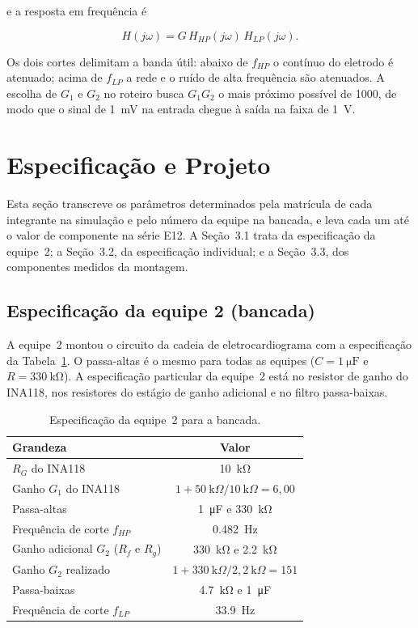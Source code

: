\documentclass[11pt,a4paper]{article}
\begin{document}
e a resposta em frequência é

\begin{equation}
H(j\omega) = G \, H_{HP}(j\omega) \, H_{LP}(j\omega) .
\label{eq:cadeia}
\end{equation}

Os dois cortes delimitam a banda útil: abaixo de $f_{HP}$ o contínuo do eletrodo é atenuado; acima de $f_{LP}$ a rede e o ruído de alta frequência são atenuados. A escolha de $G_1$ e $G_2$ no roteiro busca $G_1 G_2$ o mais próximo possível de 1000, de modo que o sinal de \SI{1}{\milli\volt} na entrada chegue à saída na faixa de \SI{1}{\volt}.

\section{Especificação e Projeto}

Esta seção transcreve os parâmetros determinados pela matrícula de cada integrante na simulação e pelo número da equipe na bancada, e leva cada um até o valor de componente na série E12. A Seção~3.1 trata da especificação da equipe~2; a Seção~3.2, da especificação individual; e a Seção~3.3, dos componentes medidos da montagem.

\subsection{Especificação da equipe 2 (bancada)}

A equipe~2 montou o circuito da cadeia de eletrocardiograma com a especificação da Tabela~\ref{tab:equipe_r4}. O passa-altas é o mesmo para todas as equipes ($C = \SI{1}{\micro\farad}$ e $R = \SI{330}{\kilo\ohm}$). A especificação particular da equipe~2 está no resistor de ganho do INA118, nos resistores do estágio de ganho adicional e no filtro passa-baixas.

\begin{table}[h]
\centering
\caption{Especificação da equipe~2 para a bancada.}
\label{tab:equipe_r4}
\begin{tabular}{lc}
\hline
Grandeza & Valor \\
\hline
$R_G$ do INA118 & \SI{10}{\kilo\ohm} \\
Ganho $G_1$ do INA118 & $1 + 50~\text{k}\Omega / 10~\text{k}\Omega = 6{,}00$ \\
Passa-altas & \SI{1}{\micro\farad} e \SI{330}{\kilo\ohm} \\
Frequência de corte $f_{HP}$ & \SI{0,482}{\hertz} \\
Ganho adicional $G_2$ ($R_f$ e $R_g$) & \SI{330}{\kilo\ohm} e \SI{2,2}{\kilo\ohm} \\
Ganho $G_2$ realizado & $1 + 330~\text{k}\Omega / 2{,}2~\text{k}\Omega = 151$ \\
Passa-baixas & \SI{4,7}{\kilo\ohm} e \SI{1}{\micro\farad} \\
Frequência de corte $f_{LP}$ & \SI{33,9}{\hertz} \\
\hline
\end{tabular}
\end{table}
\end{document}
